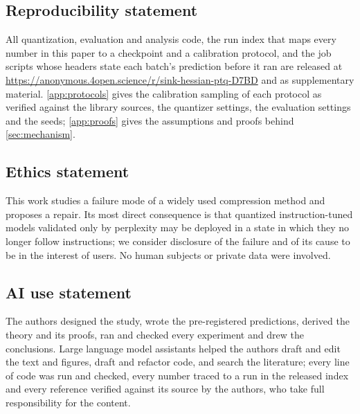 \subsection*{Reproducibility statement}
All quantization, evaluation and analysis code, the run index that maps every number in this paper to a checkpoint and a calibration protocol, and the job scripts whose headers state each batch's prediction before it ran are released at \url{https://anonymous.4open.science/r/sink-hessian-ptq-D7BD} and as supplementary material.
\cref{app:protocols} gives the calibration sampling of each protocol as verified against the library sources, the quantizer settings, the evaluation settings and the seeds; \cref{app:proofs} gives the assumptions and proofs behind \cref{sec:mechanism}.

\subsection*{Ethics statement}
This work studies a failure mode of a widely used compression method and proposes a repair.
Its most direct consequence is that quantized instruction-tuned models validated only by perplexity may be deployed in a state in which they no longer follow instructions; we consider disclosure of the failure and of its cause to be in the interest of users.
No human subjects or private data were involved.

\subsection*{AI use statement}
The authors designed the study, wrote the pre-registered predictions, derived the theory and its proofs, ran and checked every experiment and drew the conclusions.
Large language model assistants helped the authors draft and edit the text and figures, draft and refactor code, and search the literature; every line of code was run and checked, every number traced to a run in the released index and every reference verified against its source by the authors, who take full responsibility for the content.
